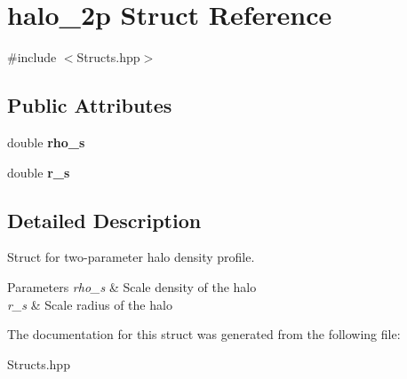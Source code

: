 \hypertarget{structhalo__2p}{}\section{halo\+\_\+2p Struct Reference}
\label{structhalo__2p}


{\ttfamily \#include $<$Structs.\+hpp$>$}

\subsection*{Public Attributes}
\begin{DoxyCompactItemize}
\item 
\mbox{\label{structhalo__2p_adc435ec1a05f25ce7e5838cd78488e9a}} 
double {\bfseries rho\+\_\+s}
\item 
\mbox{\label{structhalo__2p_ae39948a26326083311108214b1ba7cd5}} 
double {\bfseries r\+\_\+s}
\end{DoxyCompactItemize}


\subsection{Detailed Description}
Struct for two-\/parameter halo density profile. 
\begin{DoxyParams}{Parameters}
{\em rho\+\_\+s} & Scale density of the halo \\
\hline
{\em r\+\_\+s} & Scale radius of the halo \\
\hline
\end{DoxyParams}


The documentation for this struct was generated from the following file\+:\begin{DoxyCompactItemize}
\item 
Structs.\+hpp\end{DoxyCompactItemize}
